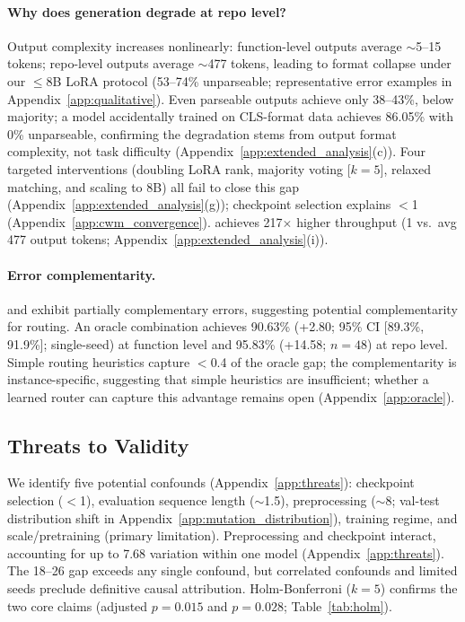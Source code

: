 \paragraph{Why does generation degrade at repo level?} Output complexity increases nonlinearly: function-level outputs average ${\sim}$5--15 tokens; repo-level outputs average ${\sim}$477 tokens, leading to format collapse under our ${\leq}$8B LoRA protocol (53--74\% unparseable; representative error examples in Appendix~\ref{app:qualitative}). Even parseable outputs achieve only 38--43\%, below majority; a model accidentally trained on CLS-format data achieves 86.05\% with 0\% unparseable, confirming the degradation stems from output format complexity, not task difficulty (Appendix~\ref{app:extended_analysis}(c)). Four targeted interventions (doubling LoRA rank, majority voting [$k{=}5$], relaxed matching, and scaling to 8B) all fail to close this gap (Appendix~\ref{app:extended_analysis}(g)); checkpoint selection explains $<$1\pp{} (Appendix~\ref{app:cwm_convergence}). \cls{} achieves 217$\times$ higher throughput (1 vs.\ avg 477 output tokens; Appendix~\ref{app:extended_analysis}(i)).

\paragraph{Error complementarity.} \cls{} and \cwm{} exhibit partially complementary errors, suggesting potential complementarity for routing. An oracle combination achieves 90.63\% (+2.80\pp{}; 95\% CI [89.3\%, 91.9\%]; single-seed) at function level and 95.83\% (+14.58\pp{}; $n{=}48$) at repo level. Simple routing heuristics capture $<$0.4\pp{} of the oracle gap; the complementarity is instance-specific, suggesting that simple heuristics are insufficient; whether a learned router can capture this advantage remains open (Appendix~\ref{app:oracle}).

\subsection{Threats to Validity}
\label{sec:threats}

We identify five potential confounds (Appendix~\ref{app:threats}): checkpoint selection ($<$1\pp{}), evaluation sequence length (${\sim}$1.5\pp{}), preprocessing (${\sim}$8\pp{}; val-test distribution shift in Appendix~\ref{app:mutation_distribution}), \traj{} training regime, and \cwm{} scale/pretraining (primary limitation). Preprocessing and checkpoint interact, accounting for up to 7.68\pp{} variation within one model (Appendix~\ref{app:threats}). The 18--26\pp{} gap exceeds any single confound, but correlated confounds and limited seeds preclude definitive causal attribution. Holm-Bonferroni ($k{=}5$) confirms the two core claims (adjusted $p{=}0.015$ and $p{=}0.028$; Table~\ref{tab:holm}).
